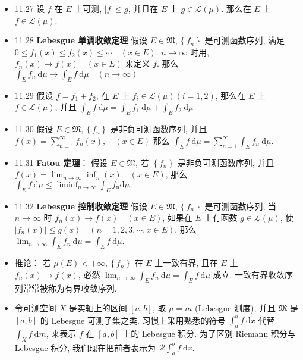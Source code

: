 \begin{itemize}
\item 11.27 设 $f$ 在 $E$ 上可测, $|f| \leqslant g$, 并且在 $E$ 上 $g \in \mathscr{L}(\mu)$. 那么在 $E$ 上 $f \in \mathscr{L}(\mu)$.

\item 11.28 \textbf{Lebesgue 单调收敛定理} 假设 $E \in \mathfrak{M},\left\{f_{n}\right\}$ 是可测函数序列, 满足 $0 \leqslant f_{1}(x) \leqslant f_{2}(x) \leqslant \cdots \quad(x \in E)$. $n \rightarrow \infty$ 时用, $f_{n}(x) \rightarrow f(x) \quad(x \in E)$ 来定义 $f$. 那么 $\int_{E} f_{n} \mathrm{~d} \mu \rightarrow \int_{E} f \mathrm{~d} \mu \quad(n \rightarrow \infty)$

\item 11.29 假设 $f=f_{1}+f_{2}$, 在 $E$ 上 $f_{i} \in \mathscr{L}(\mu)(i=1,2)$, 那么在 $E$ 上 $f \in \mathscr{L}(\mu)$, 并且 $\int_{E} f \mathrm{~d} \mu=\int_{E} f_{1} \mathrm{~d} \mu+\int_{E} f_{2} \mathrm{~d} \mu$

\item 11.30 假设 $E \in \mathfrak{M},\left\{f_{n}\right\}$ 是非负可测函数序列, 并且 $f(x)=\sum_{n=1}^{\infty} f_{n}(x), \quad(x \in E)$ 那么 $\int_{E} f \mathrm{~d} \mu=\sum_{n=1}^{\infty} \int_{E} f_{n} \mathrm{~d} \mu$.

\item 11.31 \textbf{Fatou 定理}： 假设 $E \in \mathfrak{M}$, 若 $\left\{f_{n}\right\}$ 是非负可测函数序列, 并且 $f(x)=\lim _{n \rightarrow \infty} \inf _{n}(x) \quad(x \in E)$, 那么 $\int_{E} f \mathrm{~d} \mu \leqslant \liminf _{n \rightarrow \infty} \int_{E} f_{\mathrm{n}} \mathrm{d} \mu$

\item 11.32 \textbf{Lebesgue 控制收敛定理} 假设 $E \in \mathfrak{M},\left\{f_{n}\right\}$ 是可测函数序列, 当 $n \rightarrow \infty$ 时 $f_{n}(x) \rightarrow f(x) \quad(x \in E)$, 如果在 $E$ 上有函数 $g \in \mathscr{L}(\mu)$, 使 $\left|f_{n}(x)\right| \leqslant g(x) \quad(n=1,2,3, \cdots, x \in E)$, 那么 $\lim _{n \rightarrow \infty} \int_{E} f_{n} \mathrm{~d} \mu=\int_{E} f \mathrm{~d} \mu$.

\item 推论： 若 $\mu(E)<+\infty,\left\{f_{n}\right\}$ 在 $E$ 上一致有界, 且在 $E$ 上 $f_{n}(x) \rightarrow f(x)$, 必然 $\lim _{n \rightarrow \infty} \int_{E} f_{n} \mathrm{~d} \mu=\int_{E} f \mathrm{~d} \mu$ 成立. 一致有界收敛序列常常被称为有界收敛序列.

\item 令可测空间 $X$ 是实轴上的区间 $[a, b]$, 取 $\mu=m$ (Lebesgue 测度), 并且 $\mathfrak{M}$ 是 $[a, b]$ 的 Lebesgue 可测子集之类. 习惯上采用熟悉的符号 $\int_{a}^{b} f \mathrm{~d} x$ 代替 $\int_{X} f \mathrm{~d} m$, 来表示 $f$ 在 $[a, b]$ 上的 Lebesgue 积分. 为了区别 Riemann 积分与 Lebesgue 积分, 我们现在把前者表示为 $\mathscr{R} \int_{a}^{b} f \mathrm{~d} x$.


\end{itemize}
